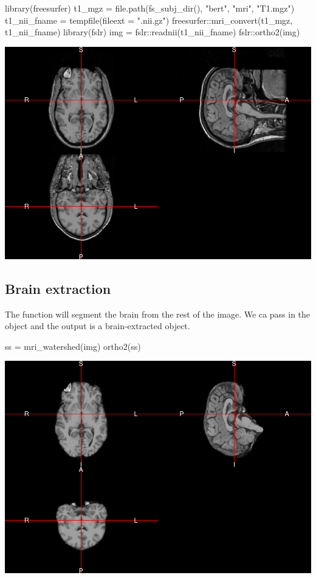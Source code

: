 \begin{Schunk}
\begin{Sinput}
library(freesurfer)
t1_mgz = file.path(fs_subj_dir(), "bert", "mri", "T1.mgz")
t1_nii_fname = tempfile(fileext = ".nii.gz")
freesurfer::mri_convert(t1_mgz, t1_nii_fname)
library(fslr)
img = fslr::readnii(t1_nii_fname)
fslr::ortho2(img)
\end{Sinput}

\includegraphics{Freesurfer_files/figure-latex/mri_convert-1} \end{Schunk}

\subsection{Brain extraction}\label{brain-extraction}

The  function will segment the brain from the rest
of the image. We ca pass in the  object and the output is a
brain-extracted  object.

\begin{Schunk}
\begin{Sinput}
ss = mri_watershed(img)
ortho2(ss)
\end{Sinput}

\includegraphics{Freesurfer_files/figure-latex/watershed-1} \end{Schunk}

